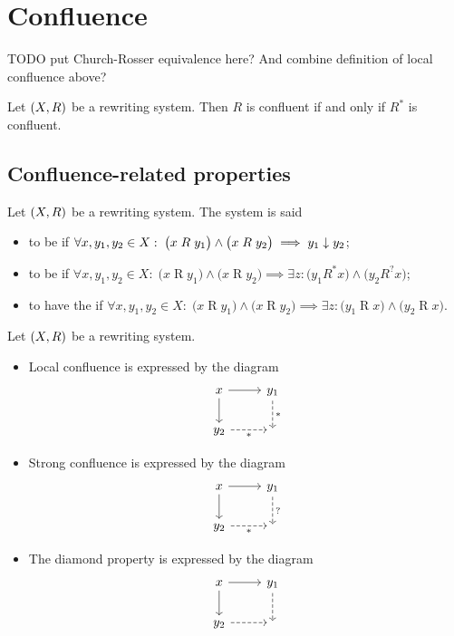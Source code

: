 \section{Confluence}
TODO put Church-Rosser equivalence here? And combine definition of local confluence above?

\begin{lemma} \label{confluenceTransitiveReflexiveClosure}
Let $\sSet{X,R}$ be a rewriting system. Then $R$ is confluent \textup{if and only if} $R^*$ is confluent.
\end{lemma}

\subsection{Confluence-related properties}
\begin{definition}
Let $\sSet{X,R}$ be a rewriting system. The system is said
\begin{itemize}
\item to be  if 
$\forall x,y_1, y_2\in X: \; \big(x\mathrel{R}y_1\big) \land \big(x\mathrel{R}y_2\big) \implies y_1 \mathrel{\downarrow} y_2$;
\item to be  if $\forall x,y_1, y_2\in X: \; \big(x\mathrel{R}y_1\big) \land \big(x\mathrel{R}y_2\big) \implies \exists z:  \big(y_1 \mathrel{R^*}x\big) \land \big(y_2\mathrel{R^?}x\big)$;
\item to have the  if $\forall x,y_1, y_2\in X: \; \big(x\mathrel{R}y_1\big) \land \big(x\mathrel{R}y_2\big) \implies \exists z: \big(y_1 \mathrel{R}x\big) \land \big(y_2\mathrel{R}x\big)$.
\end{itemize}
\end{definition}

\begin{example}
Let $\sSet{X,R}$ be a rewriting system.
\begin{itemize}
\item Local confluence is expressed by the diagram
\[ \begin{tikzcd}
x \arrow[r, "{}"] \arrow[d, swap, "{}"] & y_1 \arrow[d, dashed, "{*}"] \\
y_2 \arrow[r, dashed, swap, "{*}"] & {}
\end{tikzcd} \]
\item Strong confluence is expressed by the diagram
\[ \begin{tikzcd}
x \arrow[r] \arrow[d, swap, "{}"] & y_1 \arrow[d, dashed, "{?}"] \\
y_2 \arrow[r, dashed, swap, "{*}"] & {}
\end{tikzcd} \]
\item The diamond property is expressed by the diagram
\[ \begin{tikzcd}
x \arrow[r] \arrow[d, swap, "{}"] & y_1 \arrow[d, dashed, "{}"] \\
y_2 \arrow[r, dashed, swap, "{}"] & {}
\end{tikzcd} \]
\end{itemize}
\end{example}


